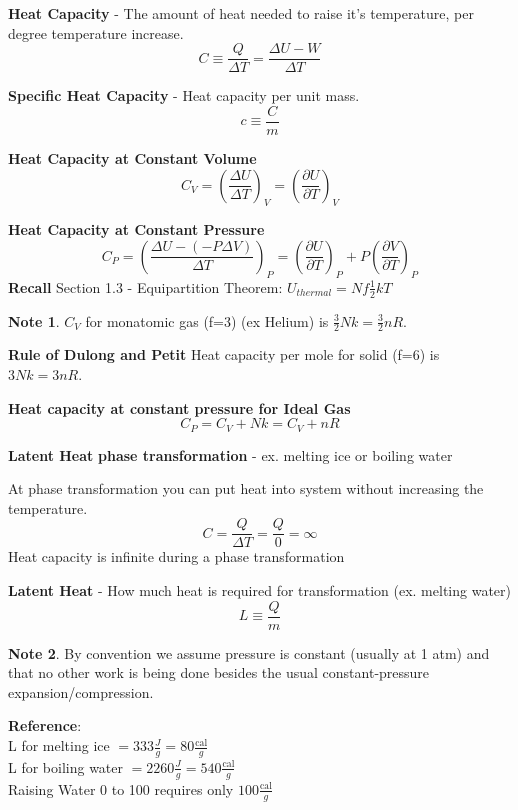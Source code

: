 \documentclass[11pt]{article}
\theoremstyle{definition}
\newtheorem{note}{Note}
\begin{document}
\textbf{Heat Capacity} - The amount of heat needed to raise it's temperature, per degree temperature increase.
\[C \equiv \frac{Q}{\Delta T} = \frac{\Delta U - W}{\Delta T}\]

\textbf{Specific Heat Capacity} - Heat capacity per unit mass.
\[c \equiv \frac{C}{m}\]
\begin{shaded}
\textbf{Heat Capacity at Constant Volume}
\begin{equation}
C_V = \left(\frac{\Delta U}{\Delta T}\right)_V = \left(\frac{\partial U}{\partial T}\right)_V
\end{equation}
\end{shaded}

\textbf{Heat Capacity at Constant Pressure}
\begin{equation}
C_P = \left(\frac{\Delta U - (-P\Delta V)}{\Delta T}\right)_P = \left(\frac{\partial U}{\partial T}\right)_P + P\left(\frac{\partial V}{\partial T}\right)_P
\end{equation}
\textbf{Recall}
Section 1.3 - Equipartition Theorem: $U_{thermal} = Nf \frac{1}{2} kT$
\begin{note}
$C_V$ for monatomic gas (f=3) (ex Helium) is $\frac{3}{2}Nk=\frac{3}{2}nR$. 

\hspace{15mm} \textbf{Rule of Dulong and Petit} Heat capacity per mole for solid (f=6) is $3Nk=3nR$. 
\end{note}

\begin{shaded}
\textbf{Heat capacity at constant pressure for Ideal Gas}
\begin{equation}
    C_P = C_V + Nk = C_V + nR
\end{equation}
\end{shaded}

\textbf{Latent Heat}
\textbf{phase transformation} - ex. melting ice or boiling water

At phase transformation you can put heat into system without increasing the temperature.
\[C=\frac{Q}{\Delta T} = \frac{Q}{0} = \infty\]
Heat capacity is infinite during a phase transformation

\textbf{Latent Heat} - How much heat is required for transformation (ex. melting water)
\[ L \equiv \frac{Q}{m} \]
\begin{note}
By convention we assume pressure is constant (usually at 1 atm) and that no other work is being done besides the usual constant-pressure expansion/compression.
\end{note}
\textbf{Reference}:\\
L for melting ice $ = 333\frac{J}{g}  = 80\frac{\text{cal}}{g}$ \\
L for boiling water $ = 2260\frac{J}{g}  = 540\frac{\text{cal}}{g}$ \\
Raising Water 0 to 100 requires only $100\frac{\text{cal}}{g}$
\end{document}
